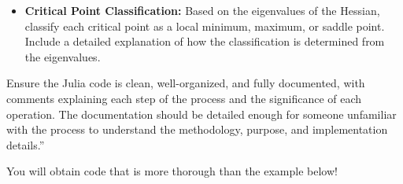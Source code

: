 {\begin{itemize}
   \item  \textbf{Critical Point Classification:} Based on the eigenvalues of the Hessian, classify each critical point as a local minimum, maximum, or saddle point. Include a detailed explanation of how the classification is determined from the eigenvalues.\\
 
\end{itemize}

Ensure the Julia code is clean, well-organized, and fully documented, with comments explaining each step of the process and the significance of each operation. The documentation should be detailed enough for someone unfamiliar with the process to understand the methodology, purpose, and implementation details.''\\
}

You will obtain code that is more thorough than the example below!\\

